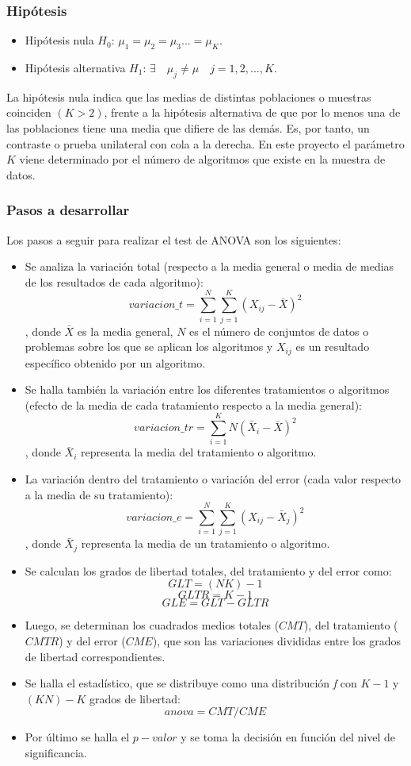\subsubsection{Hipótesis}
\begin{itemize}
\item Hipótesis nula $H_0$: $\mu_1 = \mu_2 = \mu_3 ... = \mu_K$.
\item Hipótesis alternativa $H_1$: $\exists \quad \mu_j \neq \mu \quad j=1,2,...,K$.
\end{itemize}
La hipótesis nula indica que las medias de distintas poblaciones o muestras coinciden $(K>2)$, frente a la
hipótesis alternativa de que por lo menos una de las poblaciones tiene una media que difiere de las demás. Es,
por tanto, un contraste o prueba unilateral con cola a la derecha. En este proyecto el parámetro $K$ viene
determinado por el número de algoritmos que existe en la muestra de datos.

\subsubsection{Pasos a desarrollar}
Los pasos a seguir para realizar el test de ANOVA son los siguientes:
\begin{itemize}
\item Se analiza la variación total (respecto a la media general o media de medias de los resultados de cada
algoritmo):
\[ variacion\_t = \sum_{i=1}^{N} \sum_{j=1}^{K} (X_{ij} - \bar{X})^2 \]
, donde $\bar{X}$ es la media general, $N$ es el número de conjuntos de datos o problemas sobre los que se
aplican los algoritmos y $X_{ij}$ es un resultado específico obtenido por un algoritmo.
\item Se halla también la variación entre los diferentes tratamientos o algoritmos (efecto de la media de cada
tratamiento respecto a la media general):
\[ variacion\_tr = \sum_{i=1}^{K} N (\bar{X}_i - \bar{X})^2 \]
, donde $\bar{X}_i$ representa la media del tratamiento o algoritmo.
\item La variación dentro del tratamiento o variación del error (cada valor respecto a la media de su tratamiento):
\[ variacion\_e = \sum_{i=1}^{N} \sum_{j=1}^{K} (X_{ij} - \bar{X}_{j})^2 \]
, donde $\bar{X}_{j}$ representa la media de un tratamiento o algoritmo.
\item Se calculan los grados de libertad totales, del tratamiento y del error como:
\[ GLT = (NK)-1 \]
\[ GLTR = K-1 \]
\[ GLE = GLT - GLTR \]
\item Luego, se determinan los cuadrados medios totales ($CMT$), del tratamiento ($CMTR$) y del error ($CME$),
que son las variaciones divididas entre los grados de libertad correspondientes.
\item Se halla el estadístico, que se distribuye como una distribución \textit{f} con $K-1$ y $(KN)-K$ grados de libertad:
\[ anova = CMT / CME \]
\item Por último se halla el $p-valor$ y se toma la decisión en función del nivel de significancia.
\end{itemize}

